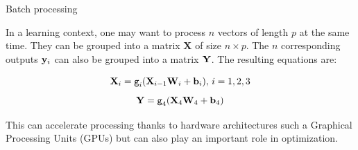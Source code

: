 \documentclass[xcolor=pdftex,dvipsnames,table,mathserif]{beamer}
\begin{document}

\begin{frame}{Batch processing}

  In a learning context, one may want to process $n$ vectors of length $p$ at the same time.
They can be grouped into a matrix $\mathbf{X}$ of size $n \times p$. The $n$ corresponding outputs $\mathbf{y}_i$ can also be grouped into a matrix $\mathbf{Y}$. The resulting equations are:

  \begin{block}{}
    \[\mathbf{X}_i = \texttt{g}_i(\mathbf{X}_{i-1}\mathbf{W}_i + \mathbf{b}_i),\, i= 1, 2, 3 \]
    \[\mathbf{Y} = \texttt{g}_4(\mathbf{X}_4\mathbf{W}_4 + \mathbf{b}_4)\]
  \end{block}

  This can accelerate processing thanks to hardware architectures such a Graphical Processing Units (GPUs) but can also play an important role in optimization.

\end{frame}
\end{document}
